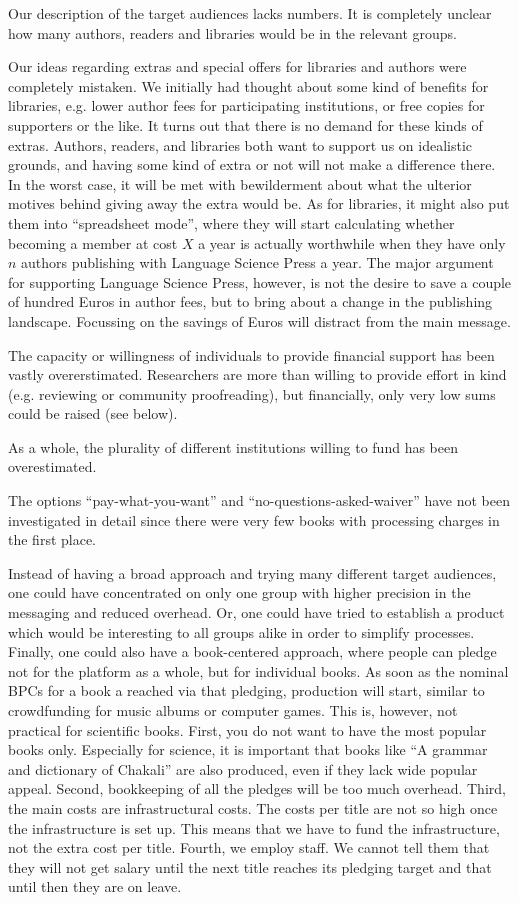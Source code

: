 \documentclass[nonflat,smallfont
]{langsci/langscibook}
\newcommand{\evaluation}[1]{
  \renewcommand{\tblslinecolour}{lsLightOrange}
  \tblssy{receipt}{Evaluation}{\vspace*{-5mm}#1}
}
\newcommand{\othersolutions}[1]{
  \renewcommand{\tblslinecolour}{lsDarkGreenOne}
  \tblssy{more}{Other solutions}{\vspace*{-5mm}#1}
}
\renewcommand{\tblssy}[4][black!12]{%
  \renewcommand{\langscisymbol}{#2}\renewcommand{\tblsboxcolor}{#1}
  \begin{mdframed}[style=yellowexercise,frametitle={#3}]
    #4
  \end{mdframed}
}
\begin{document}
\evaluation{
Our description of the target audiences lacks numbers. It is completely unclear how many authors, readers and libraries would be in the relevant groups. 

Our ideas regarding extras and special offers for libraries and authors were completely mistaken. We initially had thought about some kind of benefits for libraries, e.g. lower author fees for participating institutions, or free copies for supporters or the like. It turns out that there is no demand for these kinds of extras. Authors, readers,  and libraries both want to support us on idealistic grounds, and having some kind of extra or not will not make a difference there. In the worst case, it will be met with bewilderment about what the ulterior motives behind giving away the extra would be. As for libraries, it might also put them into ``spreadsheet mode'', where they will start calculating whether becoming a member at cost $X$ a year is actually worthwhile when they have only $n$ authors publishing with Language Science Press a year. The major argument for supporting Language Science Press, however, is not the desire to save a couple of hundred Euros in author fees, but to bring about a change in the publishing landscape. Focussing on the savings of Euros will distract from the main message. 

The capacity or willingness of individuals to provide financial support has been vastly overerstimated. Researchers are more than willing to provide effort in kind (e.g. reviewing or community proofreading), but financially, only very low sums could be raised (see below). 

As a whole, the plurality of different institutions willing to fund has been overestimated. 

The options ``pay-what-you-want'' and ``no-questions-asked-waiver'' have not been investigated in detail since there were very few books with processing charges in the first place. 


}
\othersolutions{Instead of having a broad approach and trying many different target audiences, one could have concentrated on only one group with higher precision in the messaging and reduced overhead. Or, one could have tried to establish a product which would be interesting to all groups alike in order to simplify processes. Finally, one could also have a book-centered approach, where people can pledge not for the platform as a whole, but for individual books. As soon as the nominal BPCs for a book a reached via that pledging, production will start, similar to crowdfunding for music albums or computer games. This is, however, not practical for scientific books. First, you do not want to have the most popular books only. Especially for science, it is important that books like ``A grammar and dictionary of Chakali'' are also produced, even if they lack wide popular appeal. Second, bookkeeping of all the pledges will be too much overhead. Third, the main costs are infrastructural costs. The costs per title are not so high once the infrastructure is set up. This means that we have to fund the infrastructure, not the extra cost per title. Fourth, we employ staff. We cannot tell them that they will not get salary until the next title reaches its pledging target and that until then they are on leave.}
\end{document}

